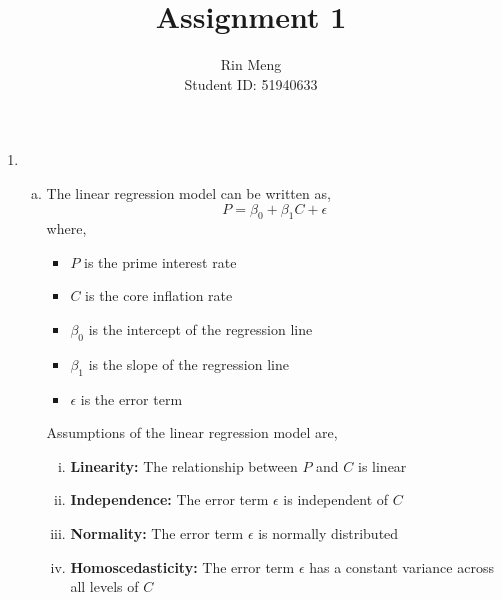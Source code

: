 \documentclass[12pt]{article}
\title{Assignment 1}
\author{Rin Meng \\ Student ID: 51940633}
\begin{document}
\maketitle

\begin{enumerate}[1.]
    \item
    \begin{enumerate}[(a)]
        \item The linear regression model can be written as, 
        \[P = \beta_0 + \beta_1 C + \epsilon\]
        where,
        \begin{itemize}
            \item $P$ is the prime interest rate
            \item $C$ is the core inflation rate
            \item $\beta_0$ is the intercept of the regression line
            \item $\beta_1$ is the slope of the regression line
            \item $\epsilon$ is the error term
        \end{itemize}
        Assumptions of the linear regression model are,
        \begin{enumerate}[i.]
            \item \textbf{Linearity:} The relationship between $P$ and $C$ is linear
            \item \textbf{Independence:} The error term $\epsilon$ is independent of $C$
            \item \textbf{Normality:} The error term $\epsilon$ is normally distributed
            \item \textbf{Homoscedasticity:} The error term $\epsilon$ has a constant variance across all levels of $C$
        \end{enumerate}
    \end{enumerate}


\end{enumerate}
\end{document}

